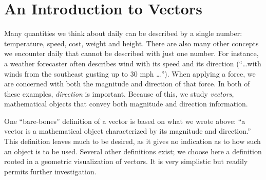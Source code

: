 \section{An Introduction to Vectors}\label{sec:vector_intro}

Many quantities we think about daily can be described by a single number: temperature, speed, cost, weight and height. There are also many other concepts we encounter daily that cannot be described with just one number. For instance, a weather forecaster often describes wind with its speed and its direction (``\ldots with winds from the southeast gusting up to 30 mph \ldots''). When applying a force, we are concerned with both the magnitude and direction of that force. In both of these examples, \emph{direction} is important. Because of this, we study \emph{vectors}, mathematical objects that convey both magnitude and direction information.\bigskip

One ``bare-bones'' definition of a vector is based on what we wrote above: ``a vector is a mathematical object characterized by its magnitude and direction.'' This definition leaves much to be desired, as it gives no indication as to how such an object is to be used. Several other definitions exist; we choose here a definition rooted in a geometric visualization of vectors. It is very simplistic but readily permits further investigation.


